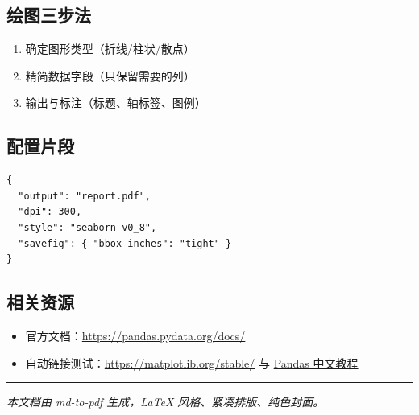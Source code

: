 \documentclass[zihao=-4]{ctexart}
\numberwithin{equation}{section}
\numberwithin{figure}{section}
\numberwithin{table}{section}
\theoremstyle{plain}
\begin{document}
\subsection{绘图三步法}

\begin{enumerate}
\item 确定图形类型（折线/柱状/散点）
\item 精简数据字段（只保留需要的列）
\item 输出与标注（标题、轴标签、图例）
\end{enumerate}

\subsection{配置片段}

\noindent \begin{lstlisting}
{
  "output": "report.pdf",
  "dpi": 300,
  "style": "seaborn-v0_8",
  "savefig": { "bbox_inches": "tight" }
}
\end{lstlisting}

\subsection{相关资源}

\begin{itemize}
\item 官方文档：\url{https://pandas.pydata.org/docs/}
\item 自动链接测试：\url{https://matplotlib.org/stable/} 与 \href{https://pandas.pydata.org/docs/getting\_started/index.html}{Pandas 中文教程}
\end{itemize}

\noindent\rule{\linewidth}{0.4pt}

\emph{本文档由 md-to-pdf 生成，LaTeX 风格、紧凑排版、纯色封面。}
\end{document}
